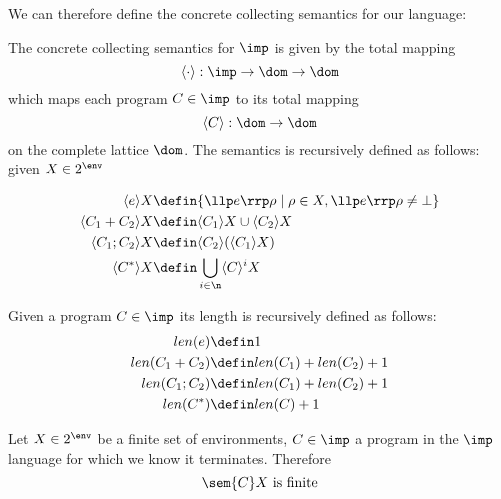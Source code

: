We can therefore define the concrete collecting semantics for our
language:

\begin{definition}
  The concrete collecting semantics for \(\imp\) is given by the total
  mapping \[\langle \cdot \rangle : \imp \to \dom \to \dom\] which
  maps each program \(C \in \imp\) to its total mapping \[\langle C
  \rangle : \dom \to \dom\] on the complete lattice \(\dom\). The
  semantics is recursively defined as follows: given \(X \in 2^\env\)

  \begin{align*}
    \langle e \rangle X & \defin \{\llp e \rrp \rho \mid \rho \in X,
    \llp e \rrp \rho \neq \bot\} \\
    \langle C_1 + C_2 \rangle X & \defin \langle C_1 \rangle X \cup
    \langle C_2 \rangle X \\
    \langle C_1 ; C_2 \rangle X & \defin \langle C_2 \rangle (\langle
    C_1 \rangle X) \\
    \langle C^* \rangle X & \defin \bigcup_{i \in \n} \langle C \rangle^i X
  \end{align*}
\end{definition}

\begin{definition}
  Given a program \(C\in\imp\) its length is recursively defined as
  follows:
  \begin{align*}
    len(e)         & \defin 1 \\
    len(C_1 + C_2) & \defin len(C_1) + len(C_2) + 1 \\
    len(C_1;C_2)   & \defin len(C_1) + len(C_2) + 1 \\
    len(C^*)       & \defin len(C) + 1
  \end{align*}
\end{definition}

\begin{lemma}
  Let \(X \in 2^\env\) be a finite set of environments, \(C \in \imp\)
  a program in the \(\imp\) language for which we know it
  terminates. Therefore \[\sem{C}X \text{ is finite}\]
\end{lemma}


